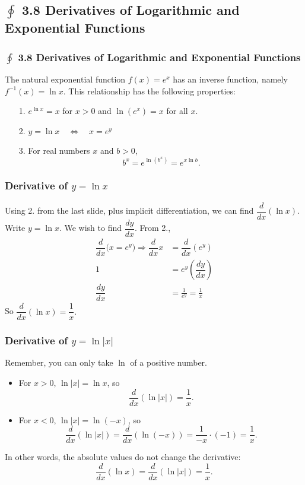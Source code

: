 \documentclass[14pt]{beamer}
\begin{document}
\begin{frame}
\subsection[3.8 Derivatives of Logarithmic and Exponential Functions]{$\oint$ 3.8 Derivatives of Logarithmic and Exponential Functions}
\frametitle{$\oint$ 3.8 Derivatives of Logarithmic and Exponential Functions}
\small
The natural exponential function $f(x)=e^x$ has an inverse function, namely $f^{-1}(x)=\ln x$.  This relationship has the following properties:
\begin{itemize}
\item[1.] $e^{\ln x}=x $ for $x>0$ and $\ln(e^x)=x$ for all $x$.
\item[2.] $y=\ln x \quad\Longleftrightarrow\quad x=e^y$
\item[3.] For real numbers $x$ and $b>0$, 
\[b^x=e^{\ln (b^x)}=e^{x \ln b}.\]
\end{itemize}
\end{frame}

\begin{frame}
\frametitle{Derivative of $y=\ln x$}
\footnotesize
Using 2. from the last slide, plus implicit differentiation, we can find $\displaystyle\dfrac{d}{dx}\left(\ln x\right)$.  Write $y=\ln x$.  We wish to find $\dfrac{dy}{dx}$.  From 2.,
\begin{align*}
\dfrac{d}{dx}\big(x=e^y\big) \Rightarrow \dfrac{d}{dx}x &= \dfrac{d}{dx}(e^y) \\[0.5pc]
1 &= e^y\left(\dfrac{dy}{dx}\right) \\[0.5pc]
\dfrac{dy}{dx} &= \frac{1}{e^y}=\frac{1}{x} 
\end{align*}
So $\dfrac{d}{dx}(\ln x)=\dfrac{1}{x}.$
\end{frame}

\begin{frame}
\frametitle{Derivative of $y=\ln |x|$}
\footnotesize
Remember, you can only take $\ln{}$ of a positive number.
\begin{itemize}
\item For $x>0$, $\ln |x| = \ln x$, so 
\[\dfrac{d}{dx} (\ln |x|)=\dfrac{1}{x}.\]
\item For $x<0$, $\ln |x| = \ln(-x)$, so 
\[\dfrac{d}{dx} (\ln |x|)= \dfrac{d}{dx} (\ln(-x)) = \dfrac{1}{-x} \cdot (-1) = \dfrac{1}{x}.\]
\end{itemize}
In other words, the absolute values do not change the derivative:
\[\dfrac{d}{dx}(\ln x)=\dfrac{d}{dx}(\ln |x|)=\dfrac{1}{x}.\]
\end{frame}
\end{document}
